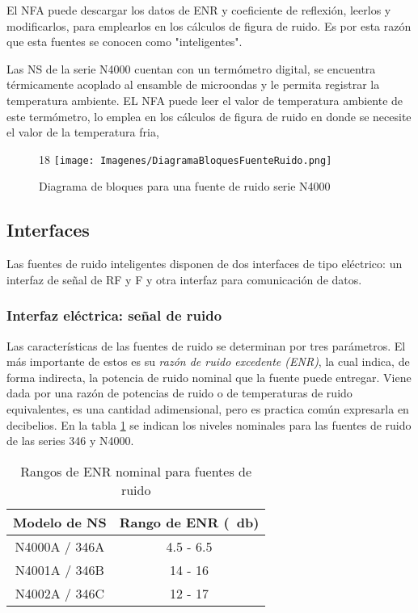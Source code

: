 	El NFA puede descargar los datos de ENR y coeficiente de reflexión, leerlos y modificarlos, para emplearlos en los cálculos de figura de ruido. Es por esta razón que esta fuentes se conocen como "inteligentes".	
	
	Las NS de la serie N4000 cuentan con un termómetro digital, se encuentra térmicamente acoplado al ensamble de microondas y le permita registrar la temperatura ambiente. EL NFA puede leer el valor de temperatura ambiente de este termómetro, lo emplea en los cálculos de figura de ruido en donde se necesite el valor de la temperatura fria, 			

	
	\begin{figure}[h!]{18}
		\centering
		\texttt{[image: Imagenes/DiagramaBloquesFuenteRuido.png]}
		\caption{Diagrama de bloques para una fuente de ruido serie N4000}
		\label{Fig:DiagramaBloquesFuenteRuido}
	\end{figure}
	

	\subsection{Interfaces}
	Las fuentes de ruido inteligentes disponen de dos interfaces de tipo eléctrico: un interfaz de señal de RF y {\textmu}F y otra interfaz para comunicación de datos. 
	
	\subsubsection{Interfaz eléctrica: señal de ruido}
	Las características de las fuentes de ruido se determinan por tres parámetros. El más importante de estos es su \emph{razón de ruido excedente (ENR)}, la cual indica, de forma indirecta, la potencia de ruido nominal que la fuente puede entregar. Viene dada por una razón de potencias de ruido o de temperaturas de ruido equivalentes, es una cantidad adimensional, pero es practica común expresarla en decibelios. En la tabla \ref{Tab:RangosNominalesENR} se indican los niveles nominales para las fuentes de ruido de las series 346 y N4000.
	
	\begin{table}[h!]
		\centering
		\begin{tabular}{cc}
			\toprule
			Modelo de NS	&	Rango de ENR (\SI{}{\decibel})		\\
			\midrule	
			N4000A / 346A	&	4.5 - 6.5 					\\
			\midrule				
			N4001A / 346B	&	14 - 16  					\\
			\midrule	
			N4002A / 346C	& 	12 - 17 					\\
			\bottomrule			
		\end{tabular}
		\caption{Rangos de ENR nominal para fuentes de ruido}
		\label{Tab:RangosNominalesENR}
	\end{table}

